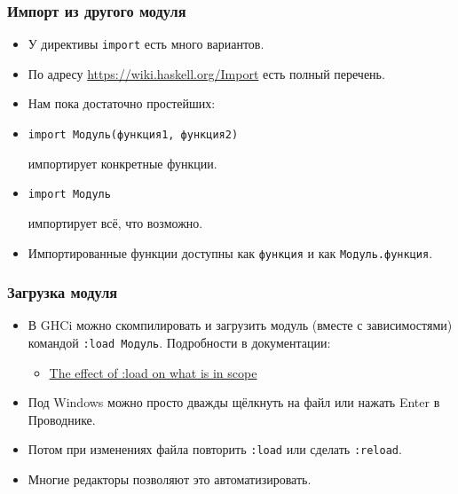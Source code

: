 \documentclass[10pt]{beamer}
\begin{document}
\begin{frame}[fragile]
  \frametitle{Импорт из другого модуля}
  \begin{itemize}
    \item У директивы \lstinline|import| есть много вариантов.
    \item По адресу \url{https://wiki.haskell.org/Import} есть полный перечень.
    \item Нам пока достаточно простейших:
    \item \begin{lstlisting}
import Модуль(функция1, функция2)
\end{lstlisting}
          импортирует конкретные функции.
    \item \begin{lstlisting}
import Модуль
\end{lstlisting}
          импортирует всё, что возможно.
    \item Импортированные функции доступны как \lstinline|функция| и как \lstinline|Модуль.функция|.
  \end{itemize}
\end{frame}

\begin{frame}[fragile]
  \frametitle{Загрузка модуля}
  \begin{itemize}
    \item В GHCi можно скомпилировать и загрузить модуль (вместе с зависимостями) командой \lstinline|:load Модуль|. Подробности в документации:
          \begin{itemize}
            \item \href{http://downloads.haskell.org/~ghc/latest/docs/html/users_guide/ghci.html#ghci-load-scope}{The effect of :load on what is in scope}
          \end{itemize}
    \item Под Windows можно просто дважды щёлкнуть на файл или нажать Enter в Проводнике.
    \item Потом при изменениях файла повторить \lstinline|:load| или сделать \lstinline|:reload|.
    \item Многие редакторы позволяют это автоматизировать.
  \end{itemize}
\end{frame}
\end{document}
